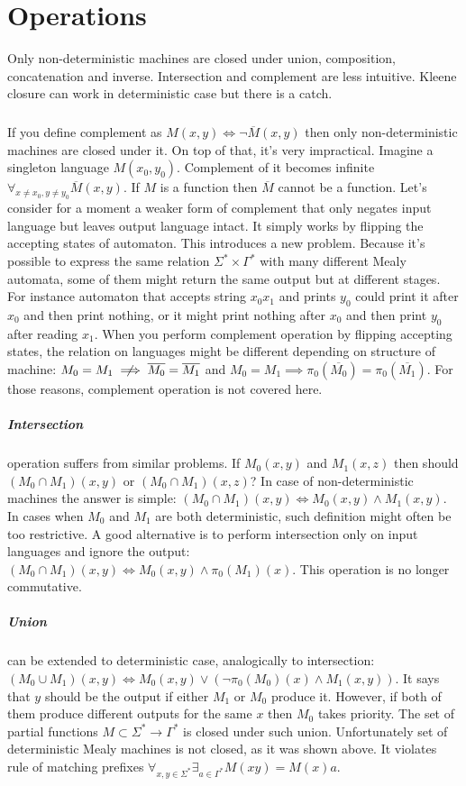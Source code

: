 \documentclass[12pt]{article}
\begin{document}
\section{Operations} Only non-deterministic machines are closed under union, composition, concatenation and inverse. Intersection and complement are less intuitive. Kleene closure can work in deterministic case but there is a catch.
\subparagraph{} If you define complement as $M(x,y) \iff \neg \overline{M}(x,y)$ then only non-deterministic machines are closed under it. On top of that, it's very impractical. Imagine a singleton language $M(x_0,y_0)$. Complement of it becomes infinite $\forall_{x\ne x_0,y\ne y_0} \overline{M}(x,y)$. If $M$ is a function then $\overline{M} $ cannot be a function. Let's consider for a moment a weaker form of complement that only negates input language but leaves output language intact. It simply works by flipping the accepting states of automaton. This introduces a new problem. Because it's possible to express the same relation $\Sigma^* \times \Gamma^*$ with many different Mealy automata, some of them might return the same output but at different stages. For instance automaton that accepts string $x_0x_1$ and prints $y_0$ could print it after $x_0$ and then print nothing, or it might print nothing after $x_0$ and then print $y_0$ after reading $x_1$. When you perform complement operation by flipping accepting states, the relation on languages might be different depending on structure of machine: $M_0 = M_1 \centernot \implies \overline{M_0} = \overline{M_1}$ and $M_0 = M_1  \implies \pi_0(\overline{M_0}) = \pi_0(\overline{M_1})$. For those reasons, complement operation is not covered here.

\subparagraph{Intersection}  operation suffers from similar problems. If $M_0(x,y)$ and $M_1(x,z)$ then should $(M_0 \cap M_1)(x,y)$ or $(M_0 \cap M_1)(x,z)$? In case of non-deterministic machines the answer is simple: $(M_0 \cap M_1)(x,y) \iff M_0(x,y) \wedge M_1(x,y)$. In cases when $M_0$ and $M_1$ are both deterministic, such definition might often be too restrictive. A good alternative is to perform intersection only on input languages and ignore the output: $(M_0 \cap M_1)(x,y) \iff M_0(x,y) \wedge \pi_0(M_1)(x)$. This operation is no longer commutative. 

\subparagraph{Union}  can be extended to deterministic case, analogically to intersection: $(M_0 \cup M_1)(x,y) \iff M_0(x,y) \vee (\neg \pi_0(M_0)(x) \wedge M_1(x,y))$. It says that $y$ should be the output if either $M_1$ or $M_0$ produce it. However, if both of them produce different outputs for the same $x$ then $M_0$ takes priority. The set of partial functions $M \subset \Sigma^* \rightarrow \Gamma^*$ is closed  under such union. Unfortunately set of deterministic Mealy machines is not closed, as it was shown above. It violates rule of matching prefixes $\forall_{x,y\in \Sigma^*} \exists_{a \in \Gamma^* } M(xy)=M(x)a$.
\end{document}
